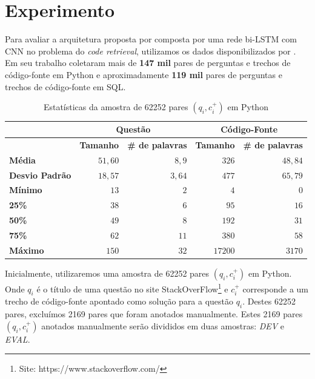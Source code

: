 \documentclass[12pt]{article}
\begin{document}




\section{Experimento}\label{sec:experimento}

Para avaliar a arquitetura proposta por \cite{tan-lstm-qa} composta por uma rede bi-LSTM com CNN no problema do \textit{code retrieval}, utilizamos os dados disponibilizados por \cite{Yao-staqc:2018}. Em seu trabalho \cite{Yao-staqc:2018} coletaram mais de \textbf{147 mil} pares de perguntas e trechos de código-fonte em Python e aproximadamente \textbf{119 mil} pares de perguntas e trechos de código-fonte em SQL. 

\begin{table}[h]
\centering
\begin{tabular}{ |p{3cm}|r|r|r|r|  }
\hline
&\multicolumn{2}{|c|}{\textbf{Questão}} & \multicolumn{2}{|c|}{\textbf{Código-Fonte}} \\
\hline
& \textbf{Tamanho} & \textbf{\# de palavras} & \textbf{Tamanho} & \textbf{\# de palavras}\\
 \hline
 \textbf{Média} & $51,60$ & $8,9$ & $326$ & $48,84$\\
 \hline
 \textbf{Desvio Padrão} & $18,57$ & $3,64$ & $477$ & $65,79$\\
 \hline
 \textbf{Mínimo} & $13$ & $2$ & $4$ & $0$\\
 \hline
 \textbf{25\%} & $38$ & $6$ & $95$ & $16$\\
 \hline
 \textbf{50\%} & $49$ & $8$ & $192$ & $31$\\
 \hline
 \textbf{75\%} & $62$ & $11$ & $380$ & $58$\\
 \hline
 \textbf{Máximo} & $150$ & $32$ & $17200$ & $3170$\\
 \hline
\end{tabular}
\caption{Estatísticas da amostra de 62252 pares $(q_{i}, c_{i}^{+})$ em Python}
\label{table:divisao-amostras}
\end{table}



Inicialmente, utilizaremos uma amostra de 62252 pares $(q_{i}, c_{i}^{+})$ em Python. Onde $q_{i}$ é o título de uma questão no site StackOverFlow\footnote{Site: https://www.stackoverflow.com/} e $c_{i}^{+}$ corresponde a um trecho de código-fonte apontado como solução para a questão $q_{i}$. Destes 62252 pares, excluímos 2169 pares que foram anotados manualmente. Estes 2169 pares $(q_{i}, c_{i}^{+})$ anotados manualmente serão divididos em duas amostras: \emph{DEV} e \emph{EVAL}.
\end{document}
